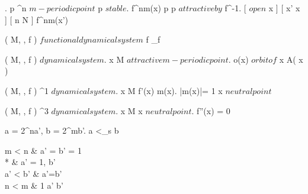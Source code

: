 \documentclass[../Main/main]{subfiles}
\begin{document}
{	
	{
		{
			.
			p \in \R^n $ m-periodic point $
		}
		{
			p $ stable $.
			\ex{ \epsilon \in \R^+ }
			{
				{
					f^{nm}(x) \convergesto p
				}
			}
		}
		{
			p $ attractive by $ f^{-1}.
			[ \Uc $ open $ \logicAnd x \in \Uc ]
			{
				[ x' \neq x ]
				{
					{
						[ n \geq N ]
						{
							f^{nm}(x') \nin \Uc
						}
					}
				}
			}
		}
	}
	
	
	
	{
		{
			( M, \N, f ) $ functional dynamical system $
		}
		{
		}
		\denote
		{
			f \as \chi_f
		}
	}
	
	
	{
		{
			( M, \N, f ) $ dynamical system $.
			x \in M $ attractive m-periodic point $.
			o(x) $ orbit of $ x
		}
		{
		}
		\denote
		{
			A( x )
		}
	}


	{
		{
			( M, \N, f ) \hspace{5pt} \Cc^1 $ dynamical system $.
			x \in M
		}
		{
			f'(x)
		}
		\denote
		{
			m(x).
			|m(x)|= 1 \as x $ neutral point $
		}
	}


	{
		{
			( M, \N, f ) \hspace{5pt} \Cc^3 $ dynamical system $.
			x \in M
		}
		{
			x $ neutral point $.
			f''(x) = 0
		}
	}
	

	{
		{
			a = 2^na', b = 2^mb'.
			a <_s b \ifandonlyif 
			\begin{cases} 
			m < n & a' = b' = 1 \\ 
			* & a' = 1, b'  \\ 
			a' < b' & a'=b' \\ 
			n < m & 1 \neq a' \neq b'
			\end{cases}
		}
	}
	
}
\end{document}
